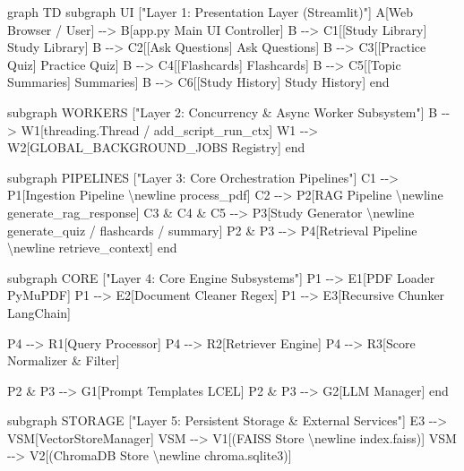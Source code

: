 \documentclass[
]{article}
\newenvironment{Shaded}{}{}
\newcommand{\NormalTok}[1]{#1}
\begin{document}
\begin{Shaded}
\begin{Highlighting}[]
\NormalTok{graph TD}
\NormalTok{    subgraph UI ["Layer 1: Presentation Layer (Streamlit)"]}
\NormalTok{        A[Web Browser / User] {-}{-}\textgreater{} B[app.py Main UI Controller]}
\NormalTok{        B {-}{-}\textgreater{} C1[[Study Library]  Study Library]}
\NormalTok{        B {-}{-}\textgreater{} C2[[Ask Questions]  Ask Questions]}
\NormalTok{        B {-}{-}\textgreater{} C3[[Practice Quiz]  Practice Quiz]}
\NormalTok{        B {-}{-}\textgreater{} C4[[Flashcards]  Flashcards]}
\NormalTok{        B {-}{-}\textgreater{} C5[[Topic Summaries]  Summaries]}
\NormalTok{        B {-}{-}\textgreater{} C6[[Study History]  Study History]}
\NormalTok{    end}

\NormalTok{    subgraph WORKERS ["Layer 2: Concurrency \& Async Worker Subsystem"]}
\NormalTok{        B {-}{-}\textgreater{} W1[threading.Thread / add\_script\_run\_ctx]}
\NormalTok{        W1 {-}{-}\textgreater{} W2[GLOBAL\_BACKGROUND\_JOBS Registry]}
\NormalTok{    end}

\NormalTok{    subgraph PIPELINES ["Layer 3: Core Orchestration Pipelines"]}
\NormalTok{        C1 {-}{-}\textgreater{} P1[Ingestion Pipeline \textbackslash{}newline process\_pdf]}
\NormalTok{        C2 {-}{-}\textgreater{} P2[RAG Pipeline \textbackslash{}newline generate\_rag\_response]}
\NormalTok{        C3 \& C4 \& C5 {-}{-}\textgreater{} P3[Study Generator \textbackslash{}newline generate\_quiz / flashcards / summary]}
\NormalTok{        P2 \& P3 {-}{-}\textgreater{} P4[Retrieval Pipeline \textbackslash{}newline retrieve\_context]}
\NormalTok{    end}

\NormalTok{    subgraph CORE ["Layer 4: Core Engine Subsystems"]}
\NormalTok{        P1 {-}{-}\textgreater{} E1[PDF Loader PyMuPDF]}
\NormalTok{        P1 {-}{-}\textgreater{} E2[Document Cleaner Regex]}
\NormalTok{        P1 {-}{-}\textgreater{} E3[Recursive Chunker LangChain]}
        
\NormalTok{        P4 {-}{-}\textgreater{} R1[Query Processor]}
\NormalTok{        P4 {-}{-}\textgreater{} R2[Retriever Engine]}
\NormalTok{        P4 {-}{-}\textgreater{} R3[Score Normalizer \& Filter]}
        
\NormalTok{        P2 \& P3 {-}{-}\textgreater{} G1[Prompt Templates LCEL]}
\NormalTok{        P2 \& P3 {-}{-}\textgreater{} G2[LLM Manager]}
\NormalTok{    end}

\NormalTok{    subgraph STORAGE ["Layer 5: Persistent Storage \& External Services"]}
\NormalTok{        E3 {-}{-}\textgreater{} VSM[VectorStoreManager]}
\NormalTok{        VSM {-}{-}\textgreater{} V1[(FAISS Store \textbackslash{}newline index.faiss)]}
\NormalTok{        VSM {-}{-}\textgreater{} V2[(ChromaDB Store \textbackslash{}newline chroma.sqlite3)]}
        

\end{Highlighting}
\end{Shaded}
\end{document}
